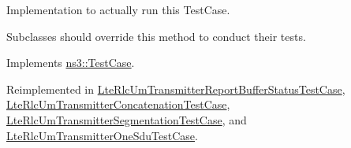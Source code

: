 Implementation to actually run this Test\+Case. 

Subclasses should override this method to conduct their tests. 

Implements \hyperlink{classns3_1_1TestCase_a8ff74680cf017ed42011e4be51917a24}{ns3\+::\+Test\+Case}.



Reimplemented in \hyperlink{classLteRlcUmTransmitterReportBufferStatusTestCase_a5aecdc76e34d93f2746ae95dd5072fe1}{Lte\+Rlc\+Um\+Transmitter\+Report\+Buffer\+Status\+Test\+Case}, \hyperlink{classLteRlcUmTransmitterConcatenationTestCase_a36dc51a9323fe7462cdef148508b0e98}{Lte\+Rlc\+Um\+Transmitter\+Concatenation\+Test\+Case}, \hyperlink{classLteRlcUmTransmitterSegmentationTestCase_afd707870f8c3653a3a82d52c3bd62dac}{Lte\+Rlc\+Um\+Transmitter\+Segmentation\+Test\+Case}, and \hyperlink{classLteRlcUmTransmitterOneSduTestCase_a5dfb3cf0c75d90b24a0e9b2be3d1bccf}{Lte\+Rlc\+Um\+Transmitter\+One\+Sdu\+Test\+Case}.


